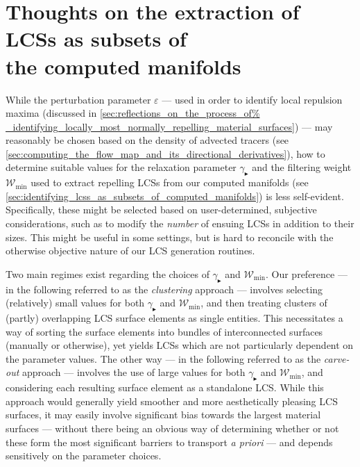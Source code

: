 \section[Thoughts on the extraction of LCSs as subsets of the computed manifolds]
{Thoughts on the extraction of LCSs as subsets of \\\phantom{5.5}
 the computed manifolds}
\label{sec:thoughts_on_the_extraction_of_lcss_as_subsets_of_the_computed%
_manifolds}

While the perturbation parameter $\varepsilon$ --- used in order to identify
local repulsion maxima (discussed in \cref{sec:reflections_on_the_process_of%
_identifying_locally_most_normally_repelling_material_surfaces}) --- may
reasonably be chosen based on the density of advected tracers (see
\cref{sec:computing_the_flow_map_and_its_directional_derivatives}), how to
determine suitable values for the relaxation parameter
$\gamma_{\blacktriangleright}$ and the filtering weight $\mathcal{W}_{\min}$
used to extract repelling LCSs from our computed manifolds (see
\cref{sec:identifying_lcss_as_subsets_of_computed_manifolds}) is less
self-evident. Specifically, these might be selected based on user-determined,
subjective considerations, such as to modify the \emph{number} of ensuing LCSs
in addition to their sizes. This might be useful in some settings, but is hard
to reconcile with the otherwise objective nature of our LCS generation
routines.

Two main regimes exist regarding the choices of
$\gamma_{\blacktriangleright}$ and $\mathcal{W}_{\min}$. Our preference --- in
the following referred to as the \emph{clustering} approach --- involves
selecting (relatively) small values for both $\gamma_{\blacktriangleright}$
and $\mathcal{W}_{\min}$, and then treating clusters of (partly) overlapping
LCS surface elements as single entities. This necessitates a way of sorting the
surface  elements into bundles of interconnected surfaces
(manually or otherwise), yet yields LCSs which are not particularly dependent
on the parameter values. The other way --- in the following referred to as the
\emph{carve-out} approach --- involves the use of large values for both
$\gamma_{\blacktriangleright}$ and $\mathcal{W}_{\min}$, and considering each
resulting surface element as a standalone LCS. While this approach would
generally yield smoother and more aesthetically pleasing LCS surfaces, it may
easily involve significant bias towards the largest material surfaces ---
without there being an obvious way of determining whether or not these form the
most significant barriers to transport \emph{a priori} --- and depends
sensitively on the parameter choices.

